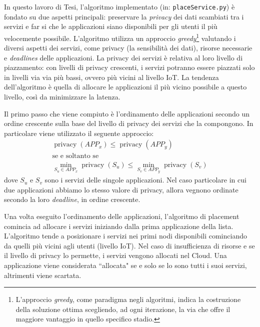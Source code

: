 In questo lavoro di Tesi, l'algoritmo implementato (in: \texttt{placeService.py}) è fondato su due aspetti principali: preservare la \textit{privacy} dei dati scambiati tra i servizi e far si che le applicazioni siano disponibili per gli utenti il più velocemente possibile. L'algoritmo utilizza un approccio \textit{greedy}\footnote{L'approccio \textit{greedy}, come paradigma negli algoritmi, indica la costruzione della soluzione ottima scegliendo, ad ogni iterazione, la via che offre il maggiore vantaggio in quello specifico stadio. } valutando i diversi aspetti dei servizi, come privacy (la sensibilità dei dati), risorse necessarie e \textit{deadlines} delle applicazioni. La privacy dei servizi è relativa al loro livello di piazzamento: con livelli di privacy crescenti, i servizi potranno essere piazzati solo in livelli via via più bassi, ovvero più vicini al livello IoT. La tendenza dell'algoritmo è quella di allocare le applicazioni il più vicino possibile a questo livello, così da minimizzare la latenza.

Il primo passo che viene compiuto è l'ordinamento delle applicazioni secondo un ordine crescente sulla base del livello di privacy dei servizi che la compongono. In particolare viene utilizzato il seguente approccio:
\begin{equation*}  
	\begin{array}{c}

\displaystyle \operatorname{privacy}(APP_x) \leq \operatorname{privacy}(APP_y)\\
\text{se e soltanto se}\\
\displaystyle \min_{S_u \in APP_x} \operatorname{privacy}(S_u) \leq \min_{S_v \in APP_y} \operatorname{privacy}(S_v)
 	\end{array}
\end{equation*}
dove $S_u$ e $S_v$ sono i servizi delle singole applicazioni. Nel caso particolare in cui due applicazioni abbiamo lo stesso valore di privacy, allora vegnono ordinate secondo la loro \textit{deadline}, in ordine crescente.

Una volta eseguito l'ordinamento delle applicazioni, l'algoritmo di placement comincia ad allocare i servizi iniziando dalla prima applicazione della lista. L'algoritmo tende a posizionare i servizi nei primi nodi disponibili cominciando da quelli più vicini agli utenti (livello IoT). Nel caso di insufficienza di risorse e se il livello di privacy lo permette, i servizi vengono allocati nel Cloud. Una applicazione viene considerata ``allocata" se e solo se lo sono tutti i suoi servizi, altrimenti viene scartata.

